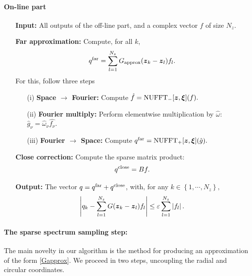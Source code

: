 \documentclass[smallextended]{svjour3}
\begin{document}
\paragraph{On-line part}
\begin{itemize}
	\item[] \textbf{Input:} All outputs of the off-line part, and a complex vector $f$ of size $N_z$. 
	\item[] \textbf{Far approximation:} Compute, for all $k$,
	      \begin{equation}
	      	\label{FarApprox}
	      	q^{\text{far}} = \sum_{l=1}^{N_z} G_{\textup{approx}}(\boldsymbol{z}_k - \boldsymbol{z}_l) f_l.
	      \end{equation} 
	      For this, follow three steps
	      \begin{itemize}
	      	\item[(i)] \textbf{Space $\rightarrow$ Fourier: } Compute $\hat{f} = \textup{NUFFT}_-[\boldsymbol{z},\boldsymbol{\xi}](f).$
	      	\item[(ii)] \textbf{Fourier multiply:} Perform elementwise multiplication by $\hat{\omega}$: ${\hat{g}_{\nu} = \hat{\omega}_\nu \hat{f_\nu}.}$
	      	\item[(iii)] \textbf{Fourier $\rightarrow$ Space: } Compute $q^{\text{far}} =  \textup{NUFFT}_+[\boldsymbol{z},\boldsymbol{\xi}](\hat{g}).$
	      \end{itemize}
	\item[] \textbf{Close correction:} Compute the sparse matrix product:
	      \[q^{\textup{close}} = Bf.\]
	\item[] \textbf{Output:} The vector $q = q^{\textup{far}} + q^{\textup{close}}$, with, for any $k \in \left\{1,\cdots,N_z\right\},$	
	      \[ \left\lvert q_k - \sum_{l = 1}^{N_z} G({\boldsymbol{z}_k - \boldsymbol{z}_l}) f_l \right\rvert \leq \varepsilon \sum_{l=1}^{N_z} \left\lvert f_l \right\rvert.\]
\end{itemize}

\paragraph{The sparse spectrum sampling step:}
The main novelty in our algorithm is the method for producing an approximation of the form \eqref{Gapprox}. We proceed in two steps, uncoupling the radial and circular coordinates. 
\end{document}
